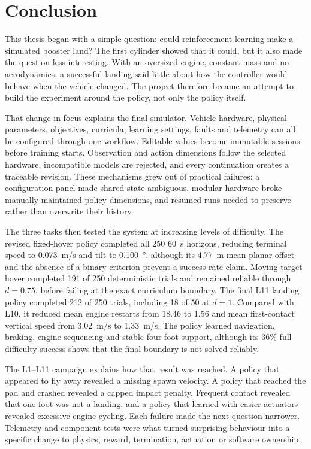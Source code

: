 \chapter{Conclusion}
\label{ch:conclusion}

This thesis began with a simple question: could reinforcement learning make a simulated booster
land? The first cylinder showed that it could, but it also made the question less interesting.
With an oversized engine, constant mass and no aerodynamics, a successful landing said little
about how the controller would behave when the vehicle changed. The project therefore became an
attempt to build the experiment around the policy, not only the policy itself.

That change in focus explains the final simulator. Vehicle hardware, physical parameters,
objectives, curricula, learning settings, faults and telemetry can all be configured through one
workflow. Editable values become immutable sessions before training starts. Observation and
action dimensions follow the selected hardware, incompatible models are rejected, and every
continuation creates a traceable revision. These mechanisms grew out of practical failures: a
configuration panel made shared state ambiguous, modular hardware broke manually maintained
policy dimensions, and resumed runs needed to preserve rather than overwrite their history.

The three tasks then tested the system at increasing levels of difficulty. The revised fixed-hover
policy completed all 250 \SI{60}{s} horizons, reducing terminal speed to \SI{0.073}{m/s} and
tilt to \SI{0.100}{\degree}, although its \SI{4.77}{m} mean planar offset and the absence of a
binary criterion prevent a success-rate claim. Moving-target hover completed 191 of 250
deterministic trials and remained reliable through $d=0.75$, before failing at the exact
curriculum boundary. The final L11 landing policy completed 212 of 250 trials,
including 18 of 50 at $d=1$. Compared with L10, it reduced mean engine restarts from 18.46 to
1.56 and mean first-contact vertical speed from \SI{3.02}{m/s} to \SI{1.33}{m/s}. The policy
learned navigation, braking, engine sequencing and stable four-foot support, although its 36\%
full-difficulty success shows that the final boundary is not solved reliably.

The L1--L11 campaign explains how that result was reached. A policy that appeared to fly away
revealed a missing spawn velocity. A policy that reached the pad and crashed revealed a capped
impact penalty. Frequent contact revealed that one foot was not a landing, and a policy that
learned with easier actuators revealed excessive engine cycling. Each failure made the next
question narrower. Telemetry and component tests were what turned surprising behaviour into a
specific change to physics, reward, termination, actuation or software ownership.


